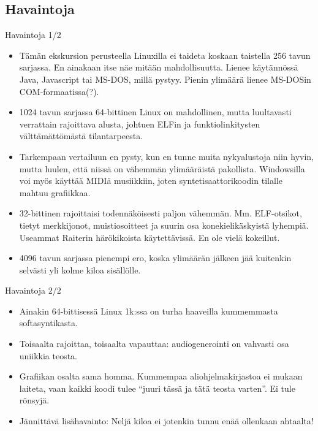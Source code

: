 \documentclass[pdf,10pt]{beamer}
\begin{document}
\subsection{Havaintoja}
\begin{frame}{Havaintoja 1/2}
  \begin{itemize}
  \item Tämän ekskursion perusteella Linuxilla ei taideta koskaan
    taistella 256 tavun sarjassa. En ainakaan itse näe mitään
    mahdollisuutta. Lienee käytännössä Java, Javascript tai MS-DOS,
    millä pystyy. Pienin ylimäärä lienee MS-DOSin COM-formaatissa(?).
  \item 1024 tavun sarjassa 64-bittinen Linux on mahdollinen, mutta
    luultavasti verrattain rajoittava alusta, johtuen ELFin ja
    funktiolinkitysten välttämättömästä tilantarpeesta.
  \item Tarkempaan vertailuun en pysty, kun en tunne muita
    nykyalustoja niin hyvin, mutta luulen, että niissä on vähemmän
    ylimääräistä pakollista. Windowsilla voi myös käyttää MIDIä
    musiikkiin, joten syntetisaattorikoodin tilalle mahtuu grafiikkaa.
  \item 32-bittinen rajoittaisi todennäköisesti paljon
    vähemmän. Mm. ELF-otsikot, tietyt merkkijonot, muistiosoitteet ja
    suurin osa konekielikäskyistä lyhempiä. Useammat Raiterin
    härökikoista käytettävissä. En ole vielä kokeillut.
  \item 4096 tavun sarjassa pienempi ero, koska ylimäärän jälkeen
    jää kuitenkin selvästi yli kolme kiloa sisällölle.
  \end{itemize}
\end{frame}

\begin{frame}{Havaintoja 2/2}
  \begin{itemize}
  \item Ainakin 64-bittisessä Linux 1k:ssa on turha haaveilla
    kummemmasta softasyntikasta.
  \item Toisaalta rajoittaa, toisaalta vapauttaa: audiogenerointi on
    vahvasti osa uniikkia teosta.
  \item Grafiikan osalta sama homma. Kummempaa aliohjelmakirjastoa ei
    mukaan laiteta, vaan kaikki koodi tulee ``juuri tässä ja tätä
    teosta varten''. Ei tule rönsyjä.
  \item Jännittävä lisähavainto: Neljä kiloa ei jotenkin tunnu enää
    ollenkaan ahtaalta!
  \end{itemize}
\end{frame}
\end{document}
